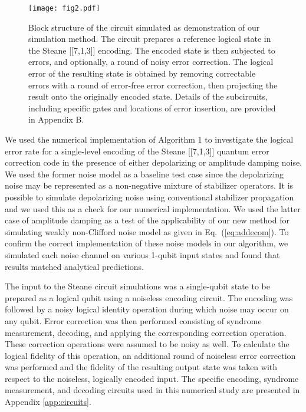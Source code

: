 \documentclass[twocolumn,pra]{revtex4}
\begin{document}
\begin{figure*}[t]
\centering
\texttt{[image: fig2.pdf]}
\caption{Block structure of the circuit simulated as demonstration of our simulation method. The circuit prepares a reference logical state in the Steane [[7,1,3]] encoding. The encoded state is then subjected to errors, and optionally, a round of noisy error correction. The logical error of the resulting state is obtained by removing correctable errors with a round of error-free error correction, then projecting the result onto the originally encoded state. Details of the subcircuits, including specific gates and locations of error insertion, are provided in Appendix B.}
\label{fig:circuit overview}
\end{figure*}

We used the numerical implementation of Algorithm 1 to investigate the logical error rate for a single-level encoding of the Steane [[7,1,3]] quantum error correction code in the presence of either depolarizing or amplitude damping noise. We used the former noise model as a baseline test case since the depolarizing noise may be represented as a non-negative mixture of stabilizer operators. It is possible to simulate depolarizing noise using conventional stabilizer propagation and we used this as a check for our numerical implementation. We used the latter case of amplitude damping as a test of the applicability of our new method for simulating weakly non-Clifford noise model as given in Eq.~(\ref{eq:addecom}). To confirm the correct implementation of these noise models in our algorithm, we simulated each noise channel on various 1-qubit input states and found that results matched analytical predictions.
\par
The input to the Steane circuit simulations was a single-qubit state to be prepared as a logical qubit using a noiseless encoding circuit. The encoding was followed by a noisy logical identity operation during which noise may occur on any qubit. Error correction was then performed consisting of syndrome measurement, decoding, and applying the corresponding correction operation. These correction operations were assumed to be noisy as well. To calculate the logical fidelity of this operation, an additional round of noiseless error correction was performed and the fidelity of the resulting output state was taken with respect to the noiseless, logically encoded input. The specific encoding, syndrome measurement, and decoding circuits used in this numerical study are presented in Appendix \ref{app:circuits}.
\par
\end{document}
